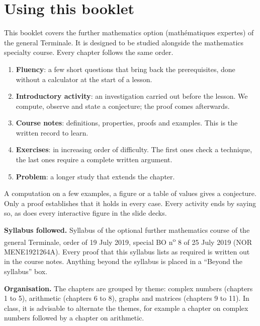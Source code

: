 \frontmatter
\chapter*{Using this booklet}
This booklet covers the further mathematics option (mathématiques expertes) of the general Terminale. It is designed to be studied alongside the mathematics specialty course. Every chapter follows the same order.
\begin{enumerate}
\item \textbf{Fluency}: a few short questions that bring back the prerequisites, done without a calculator at the start of a lesson.
\item \textbf{Introductory activity}: an investigation carried out before the lesson. We compute, observe and state a conjecture; the proof comes afterwards.
\item \textbf{Course notes}: definitions, properties, proofs and examples. This is the written record to learn.
\item \textbf{Exercises}: in increasing order of difficulty. The first ones check a technique, the last ones require a complete written argument.
\item \textbf{Problem}: a longer study that extends the chapter.
\end{enumerate}
\begin{keypoint}
A computation on a few examples, a figure or a table of values gives a conjecture. Only a proof establishes that it holds in every case. Every activity ends by saying so, as does every interactive figure in the slide decks.
\end{keypoint}
\textbf{Syllabus followed.} Syllabus of the optional further mathematics course of the general Terminale, order of 19 July 2019, special BO n\textsuperscript{o} 8 of 25 July 2019 (NOR MENE1921264A). Every proof that this syllabus lists as required is written out in the course notes. Anything beyond the syllabus is placed in a ``Beyond the syllabus'' box.

\textbf{Organisation.} The chapters are grouped by theme: complex numbers (chapters 1 to 5), arithmetic (chapters 6 to 8), graphs and matrices (chapters 9 to 11). In class, it is advisable to alternate the themes, for example a chapter on complex numbers followed by a chapter on arithmetic.
\ifmxteacher
\mxnewpage
